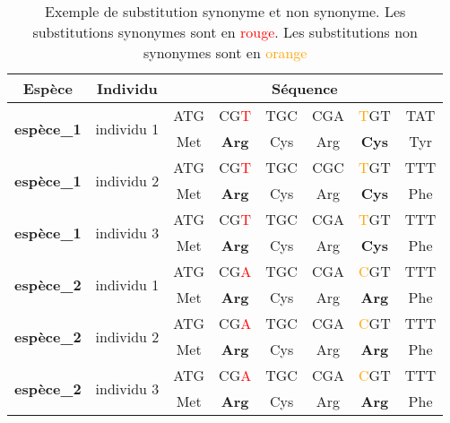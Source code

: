 \documentclass[../main]{subfiles} %
\begin{document}


\begin{table}[]
    \centering
    \footnotesize
    \begin{tabular}{cccccccc}
        \toprule
        \textbf{Espèce}                     & \textbf{Individu}             & \multicolumn{6}{c}{\textbf{Séquence}} \\
        \midrule
        \multirow{2}{*}{\textbf{espèce\_1}} & \multirow{2}{*}{individu 1}   & ATG  & CG\textcolor{red}{T}  & TGC  & CGA  & \textcolor{orange}{T}GT & TAT \\
                                            &                               & Met  & \textbf{Arg}  & Cys  & Arg  & \textbf{Cys}  & Tyr \\
        \midrule
        \multirow{2}{*}{\textbf{espèce\_1}} & \multirow{2}{*}{individu 2}   & ATG  & CG\textcolor{red}{T}  & TGC  & CGC  & \textcolor{orange}{T}GT & TTT \\
                                            &                               & Met  & \textbf{Arg}  & Cys  & Arg  & \textbf{Cys}  & Phe \\
        \midrule
        \multirow{2}{*}{\textbf{espèce\_1
        }} & \multirow{2}{*}{individu 3}   & ATG  & CG\textcolor{red}{T}  & TGC  & CGA  & \textcolor{orange}{T}GT & TTT \\
                                            &                               & Met  & \textbf{Arg}  & Cys  & Arg  & \textbf{Cys}  & Phe \\
        \midrule
        \multirow{2}{*}{\textbf{espèce\_2}} & \multirow{2}{*}{individu 1} & ATG  & CG\textcolor{red}{A}  & TGC  & CGA  & \textcolor{orange}{C}GT & TTT \\
                                            &                               & Met  & \textbf{Arg}  & Cys  & Arg  & \textbf{Arg}  & Phe   \\
        \midrule
        \multirow{2}{*}{\textbf{espèce\_2}} & \multirow{2}{*}{individu 2}   & ATG  & CG\textcolor{red}{A} & TGC  & CGA  & \textcolor{orange}{C}GT & TTT \\
                                            &                               & Met  & \textbf{Arg}  & Cys  & Arg  & \textbf{Arg}  & Phe   \\
        \midrule
        \multirow{2}{*}{\textbf{espèce\_2}} & \multirow{2}{*}{individu 3}   & ATG  & CG\textcolor{red}{A}  & TGC  & CGA  & \textcolor{orange}{C}GT & TTT \\
                                            &                               & Met  & \textbf{Arg}  & Cys  & Arg  & \textbf{Arg}  & Phe   \\
        \bottomrule
    \end{tabular}
    \scriptsize \caption{\small Exemple de substitution synonyme et non synonyme. Les substitutions synonymes sont en \textcolor{red}{rouge}. Les substitutions non synonymes sont en \textcolor{orange}{orange}}
    
    \label{tab:seqEx}
\end{table}
\end{document}
